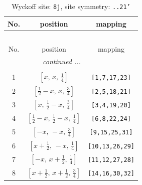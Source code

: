\documentclass[fleqn,8pt]{jsarticle}
\begin{document}
\begin{longtable}{ccc}
\caption{Wyckoff site: {\tt 8j}, site symmetry: {\tt ..21'}}
 \\
 \hline \hline
No. & position & mapping \\ \hline \endfirsthead

\multicolumn{2}{l}{\tablename\ \thetable{}} \\
 \hline \hline
No. & position & mapping \\ \hline \endhead

 \hline \hline
\multicolumn{2}{r}{\footnotesize\it continued ...} \\ \endfoot

 \hline \hline
\multicolumn{2}{r}{} \\ \endlastfoot

1 & $\left[ x,\, x,\, \frac{1}{4} \right]$ & {\tt [1,7,17,23]} \\ \hline
2 & $\left[ \frac{1}{2} - x,\, x,\, \frac{3}{4} \right]$ & {\tt [2,5,18,21]} \\ \hline
3 & $\left[ x,\, \frac{1}{2} - x,\, \frac{3}{4} \right]$ & {\tt [3,4,19,20]} \\ \hline
4 & $\left[ \frac{1}{2} - x,\, \frac{1}{2} - x,\, \frac{1}{4} \right]$ & {\tt [6,8,22,24]} \\ \hline
5 & $\left[ - x,\, - x,\, \frac{3}{4} \right]$ & {\tt [9,15,25,31]} \\ \hline
6 & $\left[ x + \frac{1}{2},\, - x,\, \frac{1}{4} \right]$ & {\tt [10,13,26,29]} \\ \hline
7 & $\left[ - x,\, x + \frac{1}{2},\, \frac{1}{4} \right]$ & {\tt [11,12,27,28]} \\ \hline
8 & $\left[ x + \frac{1}{2},\, x + \frac{1}{2},\, \frac{3}{4} \right]$ & {\tt [14,16,30,32]} \\
\end{longtable}
\renewcommand{\arraystretch}{1.2}
\end{document}
